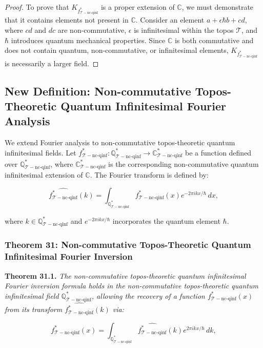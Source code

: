 \documentclass{article}
\begin{document}
\begin{proof}
To prove that \(K_{f_{\mathcal{T}-\text{nc-qinf}}^*}\) is a proper extension of \(\mathbb{C}\), we must demonstrate that it contains elements not present in \(\mathbb{C}\). Consider an element \(a + \epsilon \hbar b + cd\), where \(cd\) and \(dc\) are non-commutative, \(\epsilon\) is infinitesimal within the topos \(\mathcal{T}\), and \(\hbar\) introduces quantum mechanical properties. Since \(\mathbb{C}\) is both commutative and does not contain quantum, non-commutative, or infinitesimal elements, \(K_{f_{\mathcal{T}-\text{nc-qinf}}^*}\) is necessarily a larger field.
\end{proof}

\subsection{New Definition: Non-commutative Topos-Theoretic Quantum Infinitesimal Fourier Analysis}
We extend Fourier analysis to non-commutative topos-theoretic quantum infinitesimal fields. Let \(f_{\mathcal{T}-\text{nc-qinf}}^*: \mathbb{Q}_{\mathcal{T}-\text{nc-qinf}}^* \to \mathbb{C}_{\mathcal{T}-\text{nc-qinf}}^*\) be a function defined over \(\mathbb{Q}_{\mathcal{T}-\text{nc-qinf}}^*\), where \(\mathbb{C}_{\mathcal{T}-\text{nc-qinf}}^*\) is the corresponding non-commutative quantum infinitesimal extension of \(\mathbb{C}\). The Fourier transform is defined by:

\[
\widehat{f_{\mathcal{T}-\text{nc-qinf}}^*}(k) = \int_{\mathbb{Q}_{\mathcal{T}-\text{nc-qinf}}^*} f_{\mathcal{T}-\text{nc-qinf}}^*(x) e^{-2\pi i k x / \hbar} \, dx,
\]

where \(k \in \mathbb{Q}_{\mathcal{T}-\text{nc-qinf}}^*\) and \(e^{-2\pi i k x / \hbar}\) incorporates the quantum element \(\hbar\).

\subsubsection{Theorem 31: Non-commutative Topos-Theoretic Quantum Infinitesimal Fourier Inversion}
\textbf{Theorem 31.1.} \textit{The non-commutative topos-theoretic quantum infinitesimal Fourier inversion formula holds in the non-commutative topos-theoretic quantum infinitesimal field \(\mathbb{Q}_{\mathcal{T}-\text{nc-qinf}}^*\), allowing the recovery of a function \(f_{\mathcal{T}-\text{nc-qinf}}^*(x)\) from its transform \(\widehat{f_{\mathcal{T}-\text{nc-qinf}}^*}(k)\) via:}

\[
f_{\mathcal{T}-\text{nc-qinf}}^*(x) = \int_{\mathbb{Q}_{\mathcal{T}-\text{nc-qinf}}^*} \widehat{f_{\mathcal{T}-\text{nc-qinf}}^*}(k) e^{2\pi i k x / \hbar} \, dk,
\]
\end{document}
